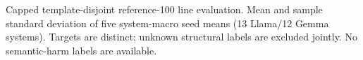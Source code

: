 Capped template-disjoint reference-100 line evaluation. Mean and sample standard deviation of five system-macro seed means (13 Llama/12 Gemma systems). Targets are distinct; unknown structural labels are excluded jointly. No semantic-harm labels are available.
